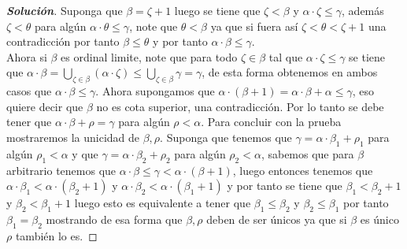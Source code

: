 \documentclass[11pt]{article}
\numberwithin{equation}{section}
\numberwithin{figure}{section}
\begin{document}
\begin{enumerate}
\begin{proof}[\textbf{Solución}]
    Suponga que $\beta=\zeta+1$ luego se tiene que $\zeta<\beta$ y $\alpha\cdot\zeta\leq\gamma$, además $\zeta<\theta$ para algún $\alpha\cdot\theta\leq\gamma$, note que $\theta<\beta$ ya que si fuera así $\zeta<\theta<\zeta+1$ una contradicción por tanto $\beta\leq\theta$ y por tanto $\alpha\cdot\beta\leq\gamma$.\\
    Ahora si $\beta$ es ordinal limite, note que para todo $\zeta\in\beta$ tal que $\alpha\cdot\zeta\leq\gamma$ se tiene que $\alpha\cdot\beta=\bigcup\limits_{\zeta\in\beta}(\alpha\cdot\zeta)\leq\bigcup\limits_{\zeta\in\beta}\gamma=\gamma$, de esta forma obtenemos en ambos casos que $\alpha\cdot\beta\leq\gamma$. Ahora supongamos que $\alpha\cdot(\beta+1)=\alpha\cdot\beta+\alpha\leq\gamma$, eso quiere decir que $\beta$ no es cota superior, una contradicción. Por lo tanto se debe tener que $\alpha\cdot\beta+\rho=\gamma$ para algún $\rho<\alpha$.
    Para concluir con la prueba mostraremos la unicidad de $\beta,\rho$. Suponga que tenemos que $\gamma=\alpha\cdot\beta_1+\rho_1$ para algún $\rho_1<\alpha$ y que $\gamma=\alpha\cdot\beta_2+\rho_2$ para algún $\rho_2<\alpha$, sabemos que para $\beta$ arbitrario tenemos que $\alpha\cdot\beta\leq\gamma<\alpha\cdot(\beta+1)$, luego entonces tenemos que $\alpha\cdot\beta_1<\alpha\cdot(\beta_2+1)$ y $\alpha\cdot\beta_2<\alpha\cdot(\beta_1+1)$ y por tanto se tiene que $\beta_1<\beta_2+1$ y $\beta_2<\beta_1+1$ luego esto es equivalente a tener que $\beta_1\leq\beta_2$ y $\beta_2\leq\beta_1$ por tanto $\beta_1=\beta_2$ mostrando de esa forma que $\beta,\rho$ deben de ser únicos ya que si $\beta$ es único $\rho$ también lo es.
    
    
    \end{proof}
\end{enumerate}
\end{document}
